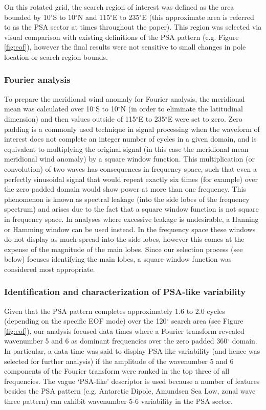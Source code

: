 On this rotated grid, the search region of interest was defined as the area bounded by 10$^{\circ}$S to 10$^{\circ}$N and 115$^{\circ}$E to 235$^{\circ}$E (this approximate area is referred to as the PSA sector at times throughout the paper). This region was selected via visual comparison with existing definitions of the PSA pattern (e.g. Figure \ref{fig:eof}), however the final results were not sensitive to small changes in pole location or search region bounds.

\subsubsection{Fourier analysis}

To prepare the meridional wind anomaly for Fourier analysis, the meridional mean was calculated over 10$^{\circ}$S to 10$^{\circ}$N (in order to eliminate the latitudinal dimension) and then values outside of 115$^{\circ}$E to 235$^{\circ}$E were set to zero. Zero padding is a commonly used technique in signal processing when the waveform of interest does not complete an integer number of cycles in a given domain, and is equivalent to multiplying the original signal (in this case the meridional mean meridional wind anomaly) by a square window function. This multiplication (or convolution) of two waves has consequences in frequency space, such that even a perfectly sinusoidal signal that would repeat exactly six times (for example) over the zero padded domain would show power at more than one frequency. This phenomenon is known as spectral leakage (into the side lobes of the frequency spectrum) and arises due to the fact that a square window function is not square in frequency space. In analyses where excessive leakage is undesirable, a Hanning or Hamming window can be used instead. In the frequency space these windows do not display as much spread into the side lobes, however this comes at the expense of the magnitude of the main lobes. Since our selection process (see below) focuses identifying the main lobes, a square window function was considered most appropriate.

\subsubsection{Identification and characterization of PSA-like variability}

Given that the PSA pattern completes approximately 1.6 to 2.0 cycles (depending on the specific EOF mode) over the 120$^{\circ}$ search area (see Figure \ref{fig:eof}), our analysis focused data times where a Fourier transform revealed wavenumber 5 and 6 as dominant frequencies over the zero padded 360$^{\circ}$ domain. In particular, a data time was said to display PSA-like variability (and hence was selected for further analysis) if the amplitude of the wavenumber 5 and 6 components of the Fourier transform were ranked in the top three of all frequencies. The vague `PSA-like' descriptor is used because a number of features besides the PSA pattern (e.g. Antarctic Dipole, Amundsen Sea Low, zonal wave three pattern) can exhibit wavenumber 5-6 variability in the PSA sector.

